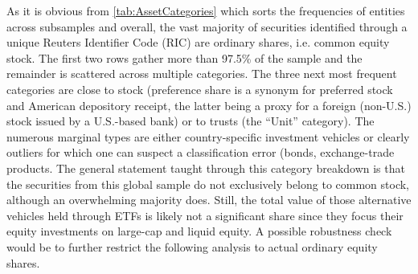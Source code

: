 As it is obvious from \autoref{tab:AssetCategories} which sorts the frequencies of entities across subsamples and overall, the vast majority of securities identified through a unique Reuters Identifier Code (RIC) are ordinary shares, i.e. common equity stock. The first two rows gather more than 97.5\% of the sample and the remainder is scattered across multiple categories. The three next most frequent categories are close to stock (preference share is a synonym for preferred stock and American depository receipt, the latter being a proxy for a foreign (non-U.S.) stock issued by a U.S.-based bank) or to trusts (the ``Unit'' category). The numerous marginal types are either country-specific investment vehicles or clearly outliers for which one can suspect a classification error (bonds, exchange-trade products. The general statement taught through this category breakdown is that the securities from this global sample do not exclusively belong to common stock, although an overwhelming majority does. Still, the total value of those alternative vehicles held through ETFs is likely not a significant share since they focus their equity investments on large-cap and liquid equity. A possible robustness check would be to further restrict the following analysis to actual ordinary equity shares. 



